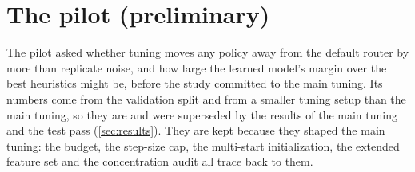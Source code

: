 %

\section{The pilot (preliminary)}
\label{sec:pilot}

The pilot asked whether tuning moves any policy away from the default router by more than
replicate noise, and how large the learned model's margin over the best heuristics might be,
before the study committed to the main tuning. Its numbers come from the validation split and from
a smaller tuning setup than the main tuning, so they are \prelim{} and were superseded by the results
of the main tuning and the test pass (\cref{sec:results}). They are kept because they shaped the main
tuning: the budget, the step-size cap, the multi-start initialization, the extended feature set and
the concentration audit all trace back to them.

